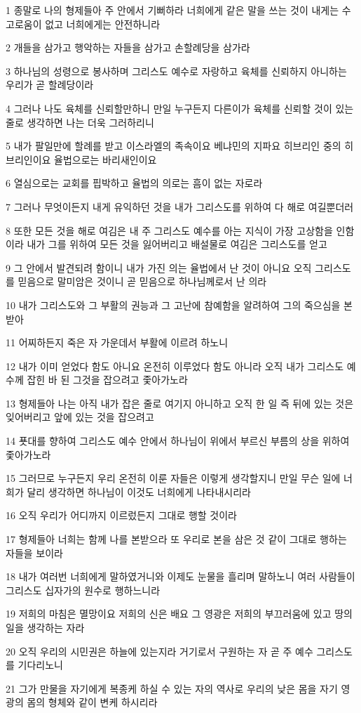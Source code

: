 \par 1 종말로 나의 형제들아 주 안에서 기뻐하라 너희에게 같은 말을 쓰는 것이 내게는 수고로움이 없고 너희에게는 안전하니라
\par 2 개들을 삼가고 행악하는 자들을 삼가고 손할례당을 삼가라
\par 3 하나님의 성령으로 봉사하며 그리스도 예수로 자랑하고 육체를 신뢰하지 아니하는 우리가 곧 할례당이라
\par 4 그러나 나도 육체를 신뢰할만하니 만일 누구든지 다른이가 육체를 신뢰할 것이 있는 줄로 생각하면 나는 더욱 그러하리니
\par 5 내가 팔일만에 할례를 받고 이스라엘의 족속이요 베냐민의 지파요 히브리인 중의 히브리인이요 율법으로는 바리새인이요
\par 6 열심으로는 교회를 핍박하고 율법의 의로는 흠이 없는 자로라
\par 7 그러나 무엇이든지 내게 유익하던 것을 내가 그리스도를 위하여 다 해로 여길뿐더러
\par 8 또한 모든 것을 해로 여김은 내 주 그리스도 예수를 아는 지식이 가장 고상함을 인함이라 내가 그를 위하여 모든 것을 잃어버리고 배설물로 여김은 그리스도를 얻고
\par 9 그 안에서 발견되려 함이니 내가 가진 의는 율법에서 난 것이 아니요 오직 그리스도를 믿음으로 말미암은 것이니 곧 믿음으로 하나님께로서 난 의라
\par 10 내가 그리스도와 그 부활의 권능과 그 고난에 참예함을 알려하여 그의 죽으심을 본받아
\par 11 어찌하든지 죽은 자 가운데서 부활에 이르려 하노니
\par 12 내가 이미 얻었다 함도 아니요 온전히 이루었다 함도 아니라 오직 내가 그리스도 예수께 잡힌 바 된 그것을 잡으려고 좇아가노라
\par 13 형제들아 나는 아직 내가 잡은 줄로 여기지 아니하고 오직 한 일 즉 뒤에 있는 것은 잊어버리고 앞에 있는 것을 잡으려고
\par 14 푯대를 향하여 그리스도 예수 안에서 하나님이 위에서 부르신 부름의 상을 위하여 좇아가노라
\par 15 그러므로 누구든지 우리 온전히 이룬 자들은 이렇게 생각할지니 만일 무슨 일에 너희가 달리 생각하면 하나님이 이것도 너희에게 나타내시리라
\par 16 오직 우리가 어디까지 이르렀든지 그대로 행할 것이라
\par 17 형제들아 너희는 함께 나를 본받으라 또 우리로 본을 삼은 것 같이 그대로 행하는 자들을 보이라
\par 18 내가 여러번 너희에게 말하였거니와 이제도 눈물을 흘리며 말하노니 여러 사람들이 그리스도 십자가의 원수로 행하느니라
\par 19 저희의 마침은 멸망이요 저희의 신은 배요 그 영광은 저희의 부끄러움에 있고 땅의 일을 생각하는 자라
\par 20 오직 우리의 시민권은 하늘에 있는지라 거기로서 구원하는 자 곧 주 예수 그리스도를 기다리노니
\par 21 그가 만물을 자기에게 복종케 하실 수 있는 자의 역사로 우리의 낮은 몸을 자기 영광의 몸의 형체와 같이 변케 하시리라

